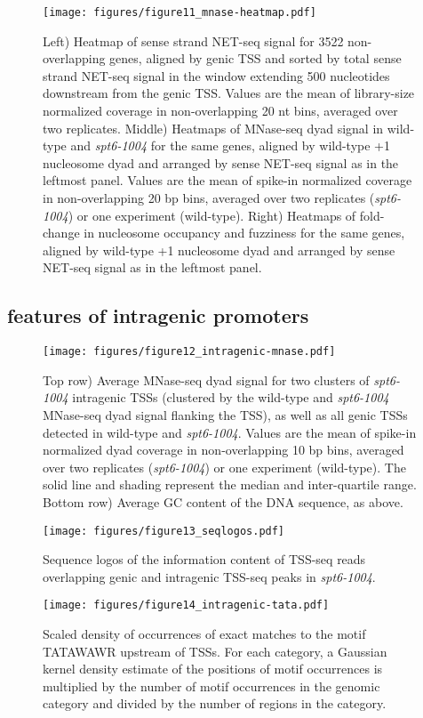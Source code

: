 \documentclass[11pt, letterpaper]{article}
\begin{document}
\begin{figure}[H]
\centering
\texttt{[image: figures/figure11\_mnase-heatmap.pdf]}
\caption{Left) Heatmap of sense strand NET-seq signal for 3522 non-overlapping genes, aligned by genic TSS and sorted by total sense strand NET-seq signal in the window extending 500 nucleotides downstream from the genic TSS. Values are the mean of library-size normalized coverage in non-overlapping 20 nt bins, averaged over two replicates. Middle) Heatmaps of MNase-seq dyad signal in wild-type and \textit{spt6-1004} for the same genes, aligned by wild-type +1 nucleosome dyad and arranged by sense NET-seq signal as in the leftmost panel. Values are the mean of spike-in normalized coverage in non-overlapping 20 bp bins, averaged over two replicates (\textit{spt6-1004}) or one experiment (wild-type). Right) Heatmaps of fold-change in nucleosome occupancy and fuzziness for the same genes, aligned by wild-type +1 nucleosome dyad and arranged by sense NET-seq signal as in the leftmost panel.}
\label{fig:mnase_heatmap}
\end{figure}

\subsection{features of intragenic promoters}

\begin{figure}[H]
\centering
\texttt{[image: figures/figure12\_intragenic-mnase.pdf]}
\caption{Top row) Average MNase-seq dyad signal for two clusters of \textit{spt6-1004} intragenic TSSs (clustered by the wild-type and \textit{spt6-1004} MNase-seq dyad signal flanking the TSS), as well as all genic TSSs detected in wild-type and \textit{spt6-1004}. Values are the mean of spike-in normalized dyad coverage in non-overlapping 10 bp bins, averaged over two replicates (\textit{spt6-1004}) or one experiment (wild-type). The solid line and shading represent the median and inter-quartile range. Bottom row) Average GC content of the DNA sequence, as above.}
\end{figure}

\begin{figure}[H]
\centering
\texttt{[image: figures/figure13\_seqlogos.pdf]}
\caption{Sequence logos of the information content of TSS-seq reads overlapping genic and intragenic TSS-seq peaks in \textit{spt6-1004}.}
\end{figure}

\begin{figure}[H]
\centering
\texttt{[image: figures/figure14\_intragenic-tata.pdf]}
\caption{Scaled density of occurrences of exact matches to the motif TATAWAWR upstream of TSSs. For each category, a Gaussian kernel density estimate of the positions of motif occurrences is multiplied by the number of motif occurrences in the genomic category and divided by the number of regions in the category.}
\end{figure}
\end{document}
